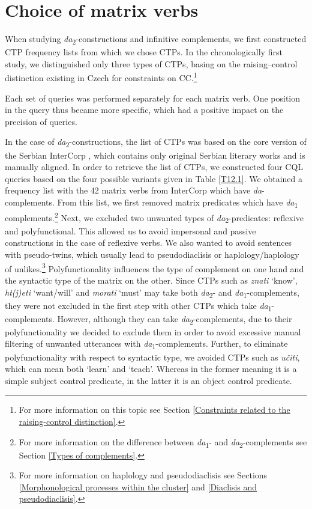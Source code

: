 \section{Choice of matrix verbs}\label{Choice of matrix verbs}
\begin{sloppypar}
When studying \textit{da}\textsubscript{2}-constructions and infinitive complements, we first constructed CTP frequency lists from which we chose CTPs. In the chronologically first study, we distinguished only three types of CTPs, basing on the raising--control distinction existing in Czech for constraints on CC.\footnote{For more information on this topic see Section \ref{Constraints related to the raising-control distinction}.}
\end{sloppypar}

Each set of queries was performed separately for each matrix verb. One position in the query thus became more specific, which had a positive impact on the precision of queries.
 
In the case of \textit{da}\textsubscript{2}-constructions, the list of CTPs was based on the core version of the Serbian InterCorp \citep{CermakRosen12}, which contains only original Serbian literary works and is manually aligned. In order to retrieve the list of CTPs, we constructed four CQL queries based on the four possible variants given in Table \ref{T12.1}. We obtained a frequency list with the 42 matrix verbs from InterCorp which have \textit{da}-complements. From this list, we first removed matrix predicates which have \textit{da}\textsubscript{1} complements.\footnote{For more information on the difference between \textit{da}\textsubscript{1}- and \textit{da}\textsubscript{2}-complements see Section \ref{Types of complements}.} Next, we excluded two unwanted types of \textit{da}\textsubscript{2}-predicates: reflexive and polyfunctional. This allowed us to avoid impersonal and passive constructions in the case of reflexive verbs. We also wanted to avoid sentences with pseudo-twins, which usually lead to pseudodiaclisis or haplology/haplology of unlikes.\footnote{For more information on haplology and pseudodiaclisis see Sections \ref{Morphonological processes within the cluster} and \ref{Diaclisis and pseudodiaclisis}.} Polyfunctionality influences the type of complement on one hand and the syntactic type of the matrix on the other. Since CTPs such as \textit{znati} ‘know’, \textit{ht(j)eti} ‘want/will’ and \textit{morati} ‘must’ may take both \textit{da}\textsubscript{2}- and \textit{da}\textsubscript{1}-complements, they were not excluded in the first step with other CTPs which take \textit{da}\textsubscript{1}-complements. However, although they can take \textit{da}\textsubscript{2}-complements, due to their polyfunctionality we decided to exclude them in order to avoid excessive manual filtering of unwanted utterances with \textit{da}\textsubscript{1}-complements. Further, to eliminate polyfunctionality with respect to syntactic type, we avoided CTPs such as \textit{učiti}, which can mean both ‘learn’ and ‘teach’. Whereas in the former meaning it is a simple subject control predicate, in the latter it is an object control predicate.

